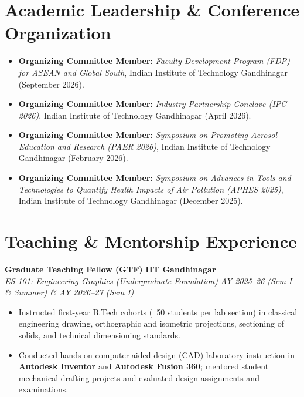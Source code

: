 \documentclass[10pt,a4paper]{article}
\newcommand{\entryheader}[4]{
    \noindent\textbf{#1} \hfill \textbf{\color{subtext}#2} \\
    \textit{#3} \hfill \textit{\color{subtext}#4}
    \vspace{1.5pt}
}
\begin{document}
\section{Academic Leadership \& Conference Organization}
\begin{itemize}
    \item \textbf{Organizing Committee Member:} \textit{Faculty Development Program (FDP) for ASEAN and Global South}, Indian Institute of Technology Gandhinagar (September 2026).
    \item \textbf{Organizing Committee Member:} \textit{Industry Partnership Conclave (IPC 2026)}, Indian Institute of Technology Gandhinagar (April 2026).
    \item \textbf{Organizing Committee Member:} \textit{Symposium on Promoting Aerosol Education and Research (PAER 2026)}, Indian Institute of Technology Gandhinagar (February 2026).
    \item \textbf{Organizing Committee Member:} \textit{Symposium on Advances in Tools and Technologies to Quantify Health Impacts of Air Pollution (APHES 2025)}, Indian Institute of Technology Gandhinagar (December 2025).
\end{itemize}

\section{Teaching \& Mentorship Experience}

\entryheader{Graduate Teaching Fellow (GTF)}{IIT Gandhinagar}{ES 101: Engineering Graphics (Undergraduate Foundation)}{AY 2025--26 (Sem I \& Summer) \& AY 2026--27 (Sem I)}
\begin{itemize}
    \item Instructed first-year B.Tech cohorts (~50 students per lab section) in classical engineering drawing, orthographic and isometric projections, sectioning of solids, and technical dimensioning standards.
    \item Conducted hands-on computer-aided design (CAD) laboratory instruction in \textbf{Autodesk Inventor} and \textbf{Autodesk Fusion 360}; mentored student mechanical drafting projects and evaluated design assignments and examinations.
\end{itemize}
\vspace{3pt}
\end{document}
